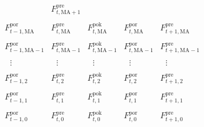 \documentclass{article}
\begin{document}
\thispagestyle{empty}
$$
\begin{array}{lllll}
 \mbox{} &   F_{t,\mathrm{MA}+1}^\mathrm{pre}  &  \mbox{}    &  \mbox{}    &   \mbox{} \\
 \mbox{} \\
F_{t-1,\mathrm{MA}}^\mathrm{por}  &   F_{t,\mathrm{MA}}^\mathrm{pre}  &   F_{t,\mathrm{MA}}^\mathrm{pok}  &   F_{t,\mathrm{MA}}^\mathrm{por}  &   F_{t+1,\mathrm{MA}}^\mathrm{pre} \\
 \mbox{} \\
F_{t-1,\mathrm{MA}-1}^\mathrm{por}  &   F_{t,\mathrm{MA}-1}^\mathrm{pre}  &   F_{t,\mathrm{MA}-1}^\mathrm{pok}  &   F_{t,\mathrm{MA}-1}^\mathrm{por}  &   F_{t+1,\mathrm{MA}-1}^\mathrm{pre} \\
 \mbox{} \\
~~~\vdots  &   ~~~\vdots  &   ~~~\vdots  &   ~~~\vdots  &   ~~~\vdots \\
 \mbox{} \\
F_{t-1,2}^\mathrm{por}  &   F_{t,2}^\mathrm{pre}  &   F_{t,2}^\mathrm{pok}  &   F_{t,2}^\mathrm{por}  &   F_{t+1,2}^\mathrm{pre} \\ 
 \mbox{} \\
F_{t-1,1}^\mathrm{por}  &   F_{t,1}^\mathrm{pre}  &   F_{t,1}^\mathrm{pok}  &   F_{t,1}^\mathrm{por}  &   F_{t+1,1}^\mathrm{pre} \\
 \mbox{} \\
F_{t-1,0}^\mathrm{por}  &   F_{t,0}^\mathrm{pre}  &   F_{t,0}^\mathrm{pok}  &   F_{t,0}^\mathrm{por}  &   F_{t+1,0}^\mathrm{pre}
\end{array}
$$
\end{document}
